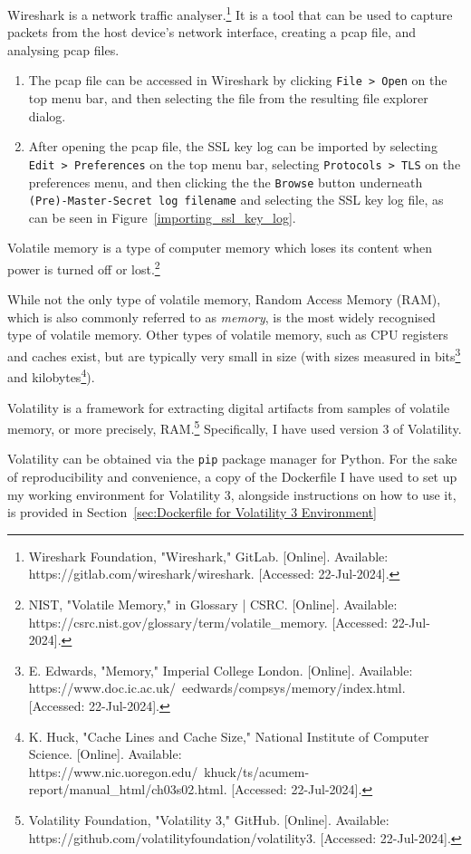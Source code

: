 \begin{myenum}
	\item Wireshark is a network traffic analyser.\footnote{Wireshark Foundation, "Wireshark," GitLab. [Online]. Available: https://gitlab.com/wireshark/wireshark. [Accessed: 22-Jul-2024].} It is a tool that can be used to capture packets from the host device's network interface, creating a pcap file, and analysing pcap files.
		\begin{enumerate}
			\item The pcap file can be accessed in Wireshark by clicking \texttt{File > Open}  on the top menu bar, and then selecting the file from the resulting file explorer dialog.
			\item After opening the pcap file, the SSL key log can be imported by selecting \texttt{Edit > Preferences} on the top menu bar, selecting \texttt{Protocols > TLS} on the preferences menu, and then clicking the the \texttt{Browse} button underneath \texttt{(Pre)-Master-Secret log filename} and selecting the SSL key log file, as can be seen in Figure~\ref{importing_ssl_key_log}.
		\end{enumerate}
	\item Volatile memory is a type of computer memory which loses its content when power is turned off or lost.\footnote{NIST, "Volatile Memory," in Glossary | CSRC. [Online]. Available: https://csrc.nist.gov/glossary/term/volatile\_memory. [Accessed: 22-Jul-2024].} 
	\item While not the only type of volatile memory, Random Access Memory (RAM), which is also commonly referred to as \emph{memory}, is the most widely recognised type of volatile memory. Other types of volatile memory, such as CPU registers and caches exist, but are typically very small in size (with sizes measured in bits\footnote{E. Edwards, "Memory," Imperial College London. [Online]. Available: https://www.doc.ic.ac.uk/~eedwards/compsys/memory/index.html. [Accessed: 22-Jul-2024].} and kilobytes\footnote{K. Huck, "Cache Lines and Cache Size," National Institute of Computer Science. [Online]. Available: https://www.nic.uoregon.edu/~khuck/ts/acumem-report/manual\_html/ch03s02.html. [Accessed: 22-Jul-2024].}).
	\item Volatility is a framework for extracting digital artifacts from samples of volatile memory, or more precisely, RAM.\footnote{Volatility Foundation, "Volatility 3," GitHub. [Online]. Available: https://github.com/volatilityfoundation/volatility3. [Accessed: 22-Jul-2024].} Specifically, I have used version 3 of Volatility.
	\item Volatility can be obtained via the \texttt{pip} package manager for Python. For the sake of reproducibility and convenience, a copy of the Dockerfile I have used to set up my working environment for Volatility 3, alongside instructions on how to use it, is provided in Section~\ref{sec:Dockerfile for Volatility 3 Environment}

\end{myenum}
